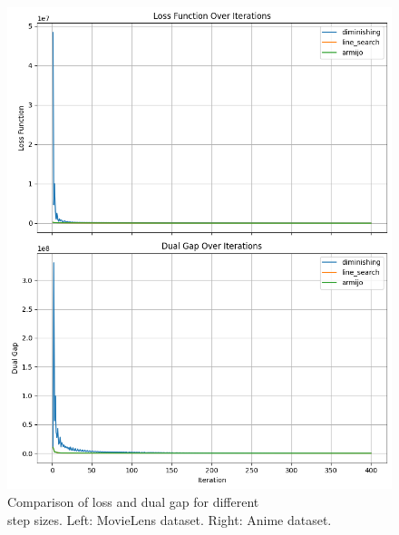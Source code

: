 \documentclass[12pt]{beamer}
\begin{document}
\begin{frame}
\begin{figure}[H]
        \includegraphics[height=0.75\textheight]{image/anime_loss_gap_comparison}
        \caption{Comparison of loss and dual gap for different \\
        step sizes. Left: MovieLens dataset. Right: Anime dataset.}
    \end{figure}
\end{frame}
\end{document}
